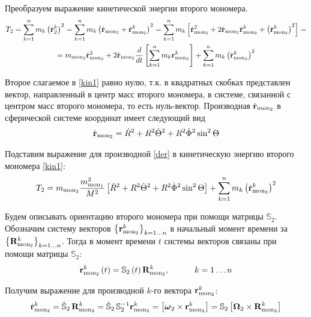 \documentclass[14pt]{extarticle}
\newcommand{\dvr}{\dot{\mathbf{r}}}
\newcommand{\mmf}{m_{\textup{mon}_1}}
\newcommand{\mms}{m_{\textup{mon}_2}}
\newcommand{\vrms}{\mathbf{r}_{\textup{mon}_2}}
\newcommand{\vRms}{\mathbf{R}_{\textup{mon}_2}}
\newcommand{\dvrms}{\dot{\mathbf{r}}_{\textup{mon}_2}}
\newcommand{\dR}{\dot{R}}
\newcommand{\dTheta}{\dot{\Theta}}
\newcommand{\dPhi}{\dot{\Phi}}
\newcommand{\omt}{\boldsymbol{\omega}_2}
\newcommand{\Omt}{\boldsymbol{\Omega}_2}
\newcommand{\bbSs}{\mathbb{S}_2}
\newcommand{\dbbSs}{\dot{\mathbb{S}}_2 \,}
\newcommand{\lb}{\left(}
\newcommand{\rb}{\right)}
\newcommand{\lsq}{\left[}
\newcommand{\rsq}{\right]}
\begin{document}
Преобразуем выражение кинетической энергии второго мономера.
\begin{gather}
	T_2 = \sum_{k = 1}^n m_k \lb \dvr_2^k \rb^2 = \sum_{k = 1}^n m_k \lb \dvrms + \dvrms^k \rb^2 = \sum_{k=1}^n m_k \left[ \dvrms^2 + 2 \dvrms \dvrms^k + \lb  \dvrms^k \rb^2 \right] = \notag \\
	= \mms \dvrms^2 + 2 \dvrms \frac{d}{dt} \left[ \sum_{k=1}^n m_k \vrms^k \right] + \sum_{k=1}^n m_k \lb \dvrms^k \rb^2 \label{kin1}
\end{gather}

Второе слагаемое в \eqref{kin1} равно нулю, т.к. в квадратных скобках представлен вектор, направленный в центр масс второго мономера, в системе, связанной с центром масс второго мономера, то есть нуль-вектор. Производная $\dvrms$ в сферической системе координат имеет следующий вид
\begin{gather}
	\dvrms = \dR^2 + R^2 \dTheta^2 + R^2 \dPhi^2 \sin^2 \Theta \label{der}
\end{gather}

Подставим выражение для производной \eqref{der} в кинетическую энергию второго мономера \eqref{kin1}:
\begin{gather}
	T_2 = \mms \frac{\mmf^2}{M^2} \left[ \dR^2 + R^2 \dTheta^2 + R^2 \dPhi^2 \sin^2 \Theta \right] + \sum_{k=1}^n m_k \lb \dvrms^k \rb^2 
\end{gather}

Будем описывать ориентацию второго мономера при помощи матрицы $\bbSs$. Обозначим систему векторов $\left\{ \vrms^k \right\}_{k=1 \dots n}$ в начальный момент времени за $\left\{ \vRms^k \right\}_{k=1 \dots n}$. Тогда в момент времени $t$ системы векторов связаны при помощи матрицы $\bbSs$:
\begin{gather}
	\vrms^k \lb t \rb = \bbSs \lb t \rb \vRms^k, \quad \quad \quad k = 1 \dots n
\end{gather}

Получим выражение для производной $k$-го вектора $\vrms^k$:
\begin{gather}
	\dvrms^k = \dbbSs \vRms^k = \dbbSs \bbSs^{-1} \vrms^k = \lsq \omt \times \vrms^k \rsq = \bbSs \lsq \Omt \times \vRms^k \rsq \label{der2}
\end{gather}
\end{document}

